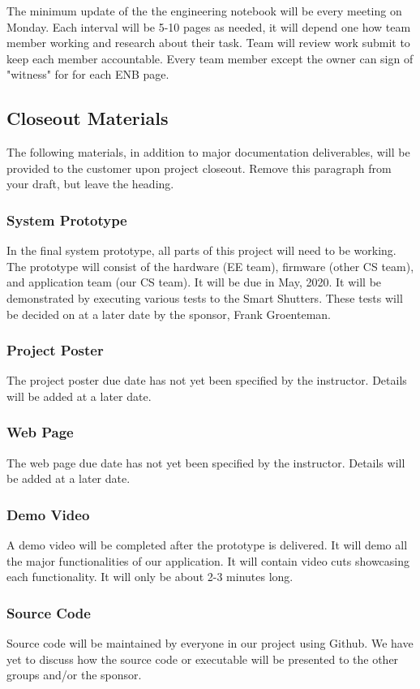 The minimum update of the the engineering notebook will be every meeting on Monday. Each interval will be 5-10 pages as needed, it will depend one how team member working and research about their task. Team will review work submit to keep each member accountable. Every team member except the owner can sign of "witness" for for each ENB page. 
\subsection{Closeout Materials}
The following materials, in addition to major documentation deliverables, will be provided to the customer upon project closeout. Remove this paragraph from your draft, but leave the heading.

\subsubsection{System Prototype}
In the final system prototype, all parts of this project will need to be working. The prototype will consist of the hardware (EE team), firmware (other CS team), and application team (our CS team). It will be due in May, 2020. It will be demonstrated by executing various tests to the Smart Shutters. These tests will be decided on at a later date by the sponsor, Frank Groenteman.


\subsubsection{Project Poster}
The project poster due date has not yet been specified by the instructor. Details will be added at a later date.

\subsubsection{Web Page}
The web page due date has not yet been specified by the instructor. Details will be added at a later date.


\subsubsection{Demo Video}
A demo video will be completed after the prototype is delivered. It will demo all the major functionalities of our application. It will contain video cuts showcasing each functionality. It will only be about 2-3 minutes long.

\subsubsection{Source Code}
Source code will be maintained by everyone in our project using Github. We have yet to discuss how the source code or executable will be presented to the other groups and/or the sponsor.

